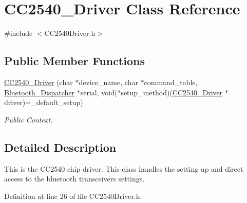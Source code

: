 \hypertarget{class_c_c2540___driver}{\section{\-C\-C2540\-\_\-\-Driver \-Class \-Reference}
\label{class_c_c2540___driver}
}


{\ttfamily \#include $<$\-C\-C2540\-Driver.\-h$>$}

\subsection*{\-Public \-Member \-Functions}
\begin{DoxyCompactItemize}
\item 
\hyperlink{class_c_c2540___driver_a7563aaba9c7b28c564b2f67e837a5682}{\-C\-C2540\-\_\-\-Driver} (char $\ast$device\-\_\-name, char $\ast$command\-\_\-table, \hyperlink{class_bluetooth___dispatcher}{\-Bluetooth\-\_\-\-Dispatcher} $\ast$serial, void($\ast$setup\-\_\-method)(\hyperlink{class_c_c2540___driver}{\-C\-C2540\-\_\-\-Driver} $\ast$driver)=\-\_\-default\-\_\-setup)
\begin{DoxyCompactList}\small\item\em \-Public \-Context. \end{DoxyCompactList}\end{DoxyCompactItemize}


\subsection{\-Detailed \-Description}
\-This is the \-C\-C2540 chip driver. \-This class handles the setting up and direct access to the bluetooth transceivers settings. 

\-Definition at line 26 of file \-C\-C2540\-Driver.\-h.



